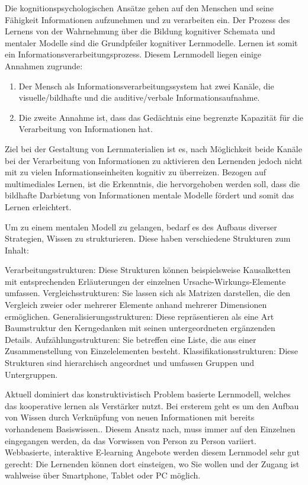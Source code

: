 \documentclass[a4paper, 12pt, twoside, BCOR=20mm, DIV=calc, abstracton, parskip=half*, toc=bibliography, toc=listof, headsepline, footsepline, headings=small, numbers=enddot]{scrreprt}
\begin{document}
	Die kognitionspsychologischen Ansätze gehen auf den Menschen und seine Fähigkeit Informationen aufzunehmen und zu verarbeiten ein. Der Prozess des Lernens von der Wahrnehmung über die Bildung kognitiver Schemata und mentaler Modelle sind die Grundpfeiler kognitiver Lernmodelle. Lernen ist somit ein Informationsverarbeitungsprozess. Diesem Lernmodell liegen einige Annahmen zugrunde: 
	\begin{enumerate}
	\item Der Mensch als Informationsverarbeitungssystem hat zwei Kanäle, die visuelle/bildhafte und die auditive/verbale Informationsaufnahme. 
	\item Die zweite Annahme ist, dass das Gedächtnis eine begrenzte Kapazität für die Verarbeitung von Informationen hat.   
	\end{enumerate} 
	Ziel bei der Gestaltung von Lernmaterialien ist es, nach Möglichkeit beide Kanäle bei der Verarbeitung von Informationen zu aktivieren den Lernenden jedoch nicht mit zu vielen Informationseinheiten kognitiv zu überreizen. \cite{baumgart1998entwicklungs}
	Bezogen auf multimediales Lernen, ist die Erkenntnis, die hervorgehoben werden soll, dass die bildhafte Darbietung von Informationen mentale Modelle fördert und somit das Lernen erleichtert.
	
	Um zu einem mentalen Modell zu gelangen, bedarf es des Aufbaus diverser Strategien, Wissen zu strukturieren. Diese haben verschiedene Strukturen zum Inhalt:
	
	Verarbeitungsstrukturen: Diese Strukturen können beispielsweise Kausalketten mit entsprechenden Erläuterungen der einzelnen Ursache-Wirkungs-Elemente umfassen.
	Vergleichsstrukturen: Sie lassen sich als Matrizen darstellen, die den Vergleich zweier oder mehrerer Elemente anhand mehrerer Dimensionen ermöglichen.
	Generalisierungsstrukturen: Diese repräsentieren als eine Art Baumstruktur den Kerngedanken mit seinen untergeordneten ergänzenden Details.
	Aufzählungsstrukturen: Sie betreffen eine Liste, die aus einer Zusammenstellung von Einzelelementen besteht.
	Klassifikationsstrukturen: Diese Strukturen sind hierarchisch angeordnet und umfassen Gruppen und Untergruppen.
	
	Aktuell dominiert das konstruktivistisch Problem basierte Lernmodell, welches das kooperative lernen als Verstärker nutzt. Bei ersterem geht es um den Aufbau von Wissen durch Verknüpfung von neuen Informationen mit bereits vorhandenem Basiswissen.\cite[S.30-32]{issing2009online}. Diesem Ansatz nach, muss immer auf den Einzelnen eingegangen werden, da das Vorwissen von Person zu Person variiert. 
	Webbasierte, interaktive E-learning Angebote %
	werden diesem Lernmodel sehr gut gerecht: Die Lernenden können dort einsteigen, wo Sie wollen und der Zugang ist wahlweise über Smartphone, Tablet oder PC möglich. 
	
\end{document}
